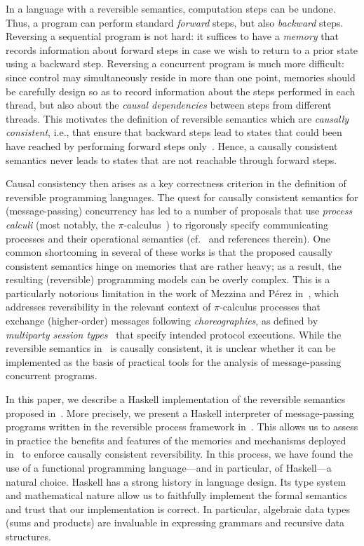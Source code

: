 \documentclass[runningheads,plain]{llncs}
\begin{document}
In a language with a reversible semantics, computation steps can be undone.
Thus, a program can perform standard \emph{forward} steps, but also \emph{backward} steps.
Reversing a sequential program is not hard: it suffices to have a \emph{memory} that records information about forward steps in case we wish to return to a prior state using a backward step. Reversing a concurrent program is much more difficult: since control may simultaneously reside in more than one point, memories should be carefully design so as to record information about the steps performed in each thread, but also about the \emph{causal dependencies} between steps from different threads.
This motivates the definition of reversible semantics which are \emph{causally consistent}, i.e., that ensure that backward steps lead to states that could been have reached by performing forward steps only~\cite{DBLP:journals/eatcs/Lanese14}. Hence, a causally consistent  semantics never leads to states that are not reachable through forward steps. 

Causal consistency then arises as a key correctness criterion in the definition of reversible programming languages. The quest for causally consistent semantics for (message-passing) concurrency has led to a number of proposals that use  \emph{process calculi} (most notably, the $\pi$-calculus~\cite{MilnerR:calmp1}) to rigorously specify communicating processes and their operational semantics (cf.~\cite{DBLP:conf/ppdp/MezzinaP17} and references therein). One common shortcoming in several of these works is that the proposed causally consistent semantics hinge on memories that are rather heavy; as a result, the resulting (reversible) programming models can be  overly complex. This is a particularly notorious limitation in the work of Mezzina and P\'{e}rez in~\cite{DBLP:conf/ppdp/MezzinaP17}, which addresses reversibility in the relevant context of $\pi$-calculus processes that exchange (higher-order) messages following \emph{choreographies}, as defined by \emph{multiparty session types}~\cite{HYC08} that specify intended protocol executions. While the reversible semantics in~\cite{DBLP:conf/ppdp/MezzinaP17} is causally consistent, it is unclear whether it can be implemented as the basis of practical tools for the  analysis of message-passing concurrent programs.

In this paper, we describe a Haskell implementation of the reversible semantics proposed in~\cite{DBLP:conf/ppdp/MezzinaP17}. More precisely, we present a Haskell interpreter of message-passing programs written in the reversible process framework in~\cite{DBLP:conf/ppdp/MezzinaP17}. This allows us to assess in practice the benefits and features of the memories and mechanisms deployed in~\cite{DBLP:conf/ppdp/MezzinaP17} to enforce causally consistent reversibility. In this process, we have found the use of a functional programming language---and in particular, of Haskell---a natural choice. Haskell has a strong history in language design. Its type system and mathematical nature allow us to faithfully implement the formal semantics and trust that our implementation is correct. In particular, algebraic data types (sums and products) are invaluable in expressing grammars and recursive data structures. 
\end{document}
